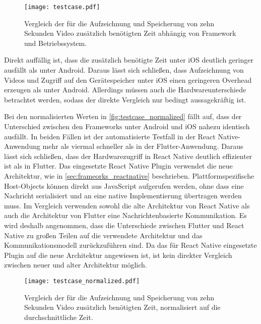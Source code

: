 \begin{figure}[ht]
  \centering 
  \texttt{[image: testcase.pdf]}
  \caption{Vergleich der für die Aufzeichnung und Speicherung von zehn Sekunden Video zusätzlich benötigten Zeit abhängig von Framework und Betriebssystem.}
  \label{fig:testcase}
\end{figure}

Direkt auffällig ist, dass die zusätzlich benötigte Zeit unter iOS deutlich geringer ausfällt als unter Android.
Daraus lässt sich schließen, dass Aufzeichnung von Videos und Zugriff auf den Gerätespeicher unter iOS einen geringeren Overhead erzeugen als unter Android.
Allerdings müssen auch die Hardwareunterschiede betrachtet werden, sodass der direkte Vergleich nur bedingt aussagekräftig ist.

Bei den normalisierten Werten in \autoref{fig:testcase_normalized} fällt auf, dass der Unterschied zwischen den Frameworks unter Android und iOS nahezu identisch ausfällt.
In beiden Fällen ist der automatisierte Testfall in der React Native-Anwendung mehr als viermal schneller als in der Flutter-Anwendung.
Daraus lässt sich schließen, dass der Hardwarezugriff in React Native deutlich effizienter ist als in Flutter.
Das eingesetzte React Native Plugin verwendet die neue Architektur, wie in \autoref{sec:frameorks_reactnative} beschrieben.
Plattformspezifische Host-Objects können direkt aus JavaScript aufgerufen werden, ohne dass eine Nachricht serialisiert und an eine native Implementierung übertragen werden muss.
Im Vergleich verwenden sowohl die alte Architektur von React Native als auch die Architektur von Flutter eine Nachrichtenbasierte Kommunikation.
Es wird deshalb angenommen, dass die Unterschiede zwischen Flutter und React Native zu großen Teilen auf die verwendete Architektur und das Kommunikationsmodell zurückzuführen sind.
Da das für React Native eingesetzte Plugin auf die neue Architektur angewiesen ist, ist kein direkter Vergleich zwischen neuer und alter Architektur möglich.
\begin{figure}[ht]
  \centering 
  \texttt{[image: testcase\_normalized.pdf]}
  \caption{Vergleich der für die Aufzeichnung und Speicherung von zehn Sekunden Video zusätzlich benötigten Zeit, normalisiert auf die durchschnittliche Zeit.}
  \label{fig:testcase_normalized}
\end{figure}
